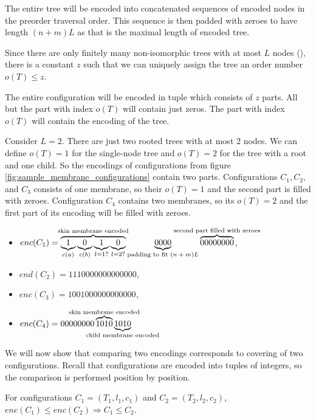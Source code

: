 The entire tree will be encoded into concatenated sequences of encoded nodes in the preorder traversal order. This sequence is then padded with zeroes to have length $(n+m)L$ as that is the maximal length of encoded tree.

Since there are only finitely many non-isomorphic trees with at most $L$ nodes (\cite{Cayley1881RootedTrees}), there is a constant $z$ such that we can uniquely assign the tree an order number $o(T) \leq z$.

The entire configuration will be encoded in tuple which consists of $z$ parts. All but the part with index $o(T)$ will contain just zeros. The part with index $o(T)$ will contain the encoding of the tree.

\begin{example}
  Consider $L=2$. There are just two rooted trees with at most 2 nodes. We can define $o(T)=1$ for the single-node tree and $o(T)=2$ for the tree with a root and one child. So the encodings of configurations from figure \ref{fig:sample_membrane_configurations} contain two parts. Configurations $C_1, C_2$, and $C_3$ consists of one membrane, so their $o(T)=1$ and the second part is filled with zeroes. Configuration $C_4$ contains two membranes, so its $o(T)=2$ and the first part of its encoding will be filled with zeroes. 
  \begin{itemize}
    \item $enc(C_1)=\overbrace{\underbrace{1}_{c(a)}\underbrace{0}_{c(b)}\underbrace{1}_{l=1?}\underbrace{0}_{l=2?}}^{\mathclap{\text{skin membrane encoded}}}\underbrace{0000}_\text{padding to fit $(n+m)L$}\overbrace{00000000}^{\mathclap{\text{second part filled with zeroes}}}$,
    \item $end(C_2)=1110000000000000$,
    \item $enc(C_3)=1001000000000000$,
    \item $enc(C_4)=00000000\overbrace{1010}^{\mathclap{\text{skin membrane encoded}}}\underbrace{1010}_{\mathclap{\text{child membrane encoded}}}$
  \end{itemize}
\end{example} 

We will now show that comparing two encodings corresponds to covering of two configurations. Recall that configurations are encoded into tuples of integers, so the comparison is performed position by position.

\begin{lemma}
\label{encoding_lemma}
  For configurations $C_1 = (T_1, l_1, c_1)$ and $C_2 = (T_2, l_2, c_2)$, $enc(C_1) \leq enc(C_2)\Rightarrow C_1\leq C_2$.
\end{lemma}


